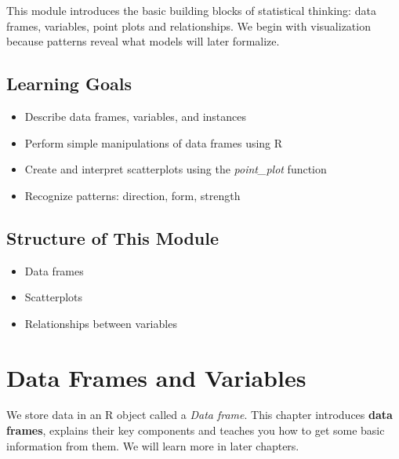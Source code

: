 \documentclass[
  12pt,
  letterpaper,
  DIV=11,
  numbers=noendperiod]{scrreprt}
\providecommand{\tightlist}{%
  \setlength{\itemsep}{0pt}\setlength{\parskip}{0pt}}
\begin{document}

This module introduces the basic building blocks of statistical
thinking: data frames, variables, point plots and relationships. We
begin with visualization because patterns reveal what models will later
formalize.

\section*{Learning Goals}\label{learning-goals}


\begin{itemize}
\tightlist
\item
  Describe data frames, variables, and instances\\
\item
  Perform simple manipulations of data frames using R
\item
  Create and interpret scatterplots using the \emph{point\_plot}
  function
\item
  Recognize patterns: direction, form, strength
\end{itemize}

\section*{Structure of This Module}\label{structure-of-this-module}


\begin{itemize}
\tightlist
\item
  Data frames\\
\item
  Scatterplots
\item
  Relationships between variables
\end{itemize}

\chapter{Data Frames and Variables}\label{data-frames-and-variables}

We store data in an R object called a \emph{Data frame}. This chapter
introduces \textbf{data frames}, explains their key components and
teaches you how to get some basic information from them. We will learn
more in later chapters.
\end{document}
